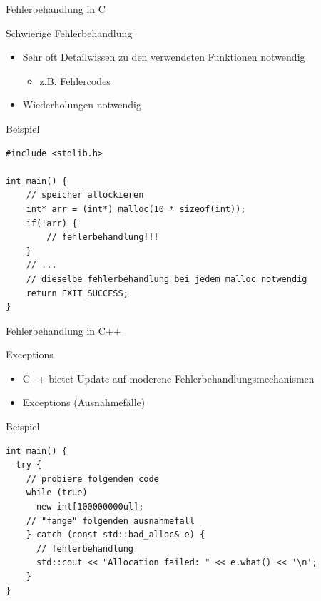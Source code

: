 \documentclass[presentation]{beamer}
\begin{document}
\begin{frame}[fragile,label=sec-1-1]{Fehlerbehandlung in C}
\begin{block}{Schwierige Fehlerbehandlung}
\begin{itemize}
	\item Sehr oft Detailwissen zu den verwendeten Funktionen notwendig
	\begin{itemize}
		\item z.B. Fehlercodes
	\end{itemize}
	\item Wiederholungen notwendig
\end{itemize}
\end{block}
\begin{exampleblock}{Beispiel}
\begin{verbatim}
#include <stdlib.h>

int main() {
	// speicher allockieren
	int* arr = (int*) malloc(10 * sizeof(int));
	if(!arr) {
		// fehlerbehandlung!!!
	}
	// ...
	// dieselbe fehlerbehandlung bei jedem malloc notwendig
	return EXIT_SUCCESS;
}
\end{verbatim}
\end{exampleblock}
\end{frame}

\begin{frame}[fragile,label=sec-1-1]{Fehlerbehandlung in C++}
\begin{block}{Exceptions}
\begin{itemize}
	\item C++ bietet Update auf moderene Fehlerbehandlungsmechanismen
	\item Exceptions (Ausnahmefälle)
\end{itemize}
\end{block}
\begin{exampleblock}{Beispiel}
\begin{verbatim}
int main() {
  try {
    // probiere folgenden code
    while (true)
      new int[100000000ul];
    // "fange" folgenden ausnahmefall
    } catch (const std::bad_alloc& e) {
      // fehlerbehandlung
      std::cout << "Allocation failed: " << e.what() << '\n';
    }
}
\end{verbatim}
\end{exampleblock}

\end{frame}
\end{document}
